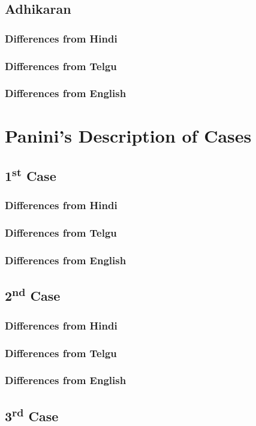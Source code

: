 \documentclass[a4paper,10pt]{article}
\begin{document}
\subsection{Adhikaran}
\subsubsection{Differences from Hindi}
\subsubsection{Differences from Telgu}
\subsubsection{Differences from English}
\section{Panini's Description of Cases}
\subsection{1\textsuperscript{st} Case}
\subsubsection{Differences from Hindi}
\subsubsection{Differences from Telgu}
\subsubsection{Differences from English}
\subsection{2\textsuperscript{nd} Case}
\subsubsection{Differences from Hindi}
\subsubsection{Differences from Telgu}
\subsubsection{Differences from English}
\subsection{3\textsuperscript{rd} Case}
\end{document}
